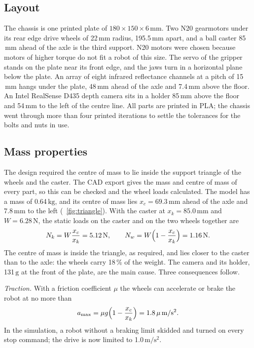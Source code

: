 \documentclass[conference,a4paper]{IEEEtran}
\newcommand{\unit}[1]{\ensuremath{\,\mathrm{#1}}}
\begin{document}
\subsection{Layout}
The chassis is one printed plate of $180\times150\times6\unit{mm}$. Two N20 gearmotors under
its rear edge drive wheels of 22\unit{mm} radius, 195.5\unit{mm} apart, and a ball caster
85\unit{mm} ahead of the axle is the third support. N20 motors were chosen because motors of
higher torque do not fit a robot of this size. The servo of the gripper stands on the plate
near its front edge, and the jaws turn in a horizontal plane below the plate. An array of
eight infrared reflectance channels at a pitch of 15\unit{mm} hangs under the plate,
48\unit{mm} ahead of the axle and 7.4\unit{mm} above the floor. An Intel RealSense D435
depth camera sits in a holder 85\unit{mm} above the floor and 54\unit{mm} to the left of the
centre line. All parts are printed in PLA; the chassis went through more than four printed
iterations to settle the tolerances for the bolts and nuts in use.

\subsection{Mass properties}
\label{sec:mass}
The design required the centre of mass to lie inside the support triangle of the wheels and
the caster. The CAD export gives the mass and centre of mass of every part, so this can be
checked and the wheel loads calculated. The model has a mass of
0.64\unit{kg}, and its centre of mass lies $x_c=69.3\unit{mm}$ ahead of the axle and
7.8\unit{mm} to the left (\figurename~\ref{fig:triangle}). With the caster at
$x_k=85.0\unit{mm}$ and $W=6.28\unit{N}$, the static loads on the caster and on the two
wheels together are
\begin{equation}
  N_k = W\frac{x_c}{x_k} = 5.12\unit{N}, \qquad N_w = W\Bigl(1-\frac{x_c}{x_k}\Bigr) = 1.16\unit{N}.
  \label{eq:loads}
\end{equation}
The centre of mass is inside the triangle, as required, and lies closer to the caster than
to the axle: the wheels carry 18\,\% of the weight.
The camera and its holder, 131\unit{g} at the front of the plate, are the main cause. Three
consequences follow.

\emph{Traction.} With a friction coefficient $\mu$ the wheels can accelerate or brake the
robot at no more than
\begin{equation}
  a_{\max} = \mu g\Bigl(1-\frac{x_c}{x_k}\Bigr) = 1.8\,\mu\unit{m/s^2}.
  \label{eq:traction}
\end{equation}
In the simulation, a robot without a braking limit skidded and turned on every stop
command; the drive is now limited to 1.0\unit{m/s^2}.
\end{document}

